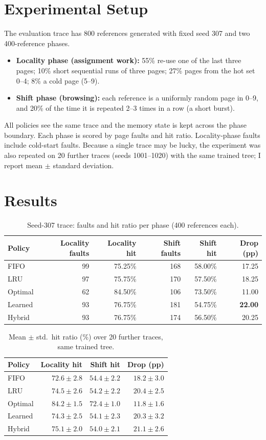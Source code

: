 \documentclass[10pt,a4paper]{article}
\begin{document}
\section{Experimental Setup}
The evaluation trace has 800 references generated with fixed seed 307 and two 400-reference phases.
\begin{itemize}
\item \textbf{Locality phase (assignment work):} 55\% re-use one of the last three pages; 10\% short sequential runs of three pages; 27\% pages from the hot set 0--4; 8\% a cold page (5--9).
\item \textbf{Shift phase (browsing):} each reference is a uniformly random page in 0--9, and 20\% of the time it is repeated 2--3 times in a row (a short burst).
\end{itemize}
All policies see the same trace and the memory state is kept across the phase boundary. Each phase is scored by page faults and hit ratio. Locality-phase faults include cold-start faults. Because a single trace may be lucky, the experiment was also repeated on 20 further traces (seeds 1001--1020) with the same trained tree; I report mean $\pm$ standard deviation.

\section{Results}
\begin{table}[H]
\centering
\caption{Seed-307 trace: faults and hit ratio per phase (400 references each).}
\label{tab:main}
\begin{tabular}{lrrrrr}
\toprule
Policy & Locality faults & Locality hit & Shift faults & Shift hit & Drop (pp)\\
\midrule
FIFO    &  99 & 75.25\% & 168 & 58.00\% & 17.25\\
LRU     &  97 & 75.75\% & 170 & 57.50\% & 18.25\\
Optimal &  62 & 84.50\% & 106 & 73.50\% & 11.00\\
Learned &  93 & 76.75\% & 181 & 54.75\% & \textbf{22.00}\\
Hybrid  &  93 & 76.75\% & 174 & 56.50\% & 20.25\\
\bottomrule
\end{tabular}
\end{table}

\begin{table}[H]
\centering
\caption{Mean $\pm$ std.\ hit ratio (\%) over 20 further traces, same trained tree.}
\label{tab:multi}
\begin{tabular}{lrrr}
\toprule
Policy & Locality hit & Shift hit & Drop (pp)\\
\midrule
FIFO    & $72.6\pm2.8$ & $54.4\pm2.2$ & $18.2\pm3.0$\\
LRU     & $74.5\pm2.6$ & $54.2\pm2.2$ & $20.4\pm2.5$\\
Optimal & $84.2\pm1.5$ & $72.4\pm1.0$ & $11.8\pm1.6$\\
Learned & $74.3\pm2.5$ & $54.1\pm2.3$ & $20.3\pm3.2$\\
Hybrid  & $75.1\pm2.0$ & $54.0\pm2.1$ & $21.1\pm2.6$\\
\bottomrule
\end{tabular}
\end{table}
\end{document}
